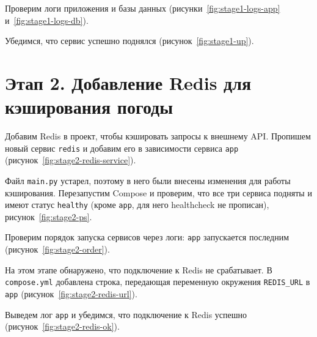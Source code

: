 
Проверим логи приложения и базы данных
(рисунки~\ref{fig:stage1-logs-app} и~\ref{fig:stage1-logs-db}).


Убедимся, что сервис успешно поднялся (рисунок~\ref{fig:stage1-up}).


\section{Этап 2. Добавление Redis для кэширования погоды}

Добавим Redis в проект, чтобы кэшировать запросы к внешнему API. Пропишем
новый сервис \texttt{redis} и добавим его в зависимости сервиса
\texttt{app} (рисунок~\ref{fig:stage2-redis-service}).


Файл \texttt{main.py} устарел, поэтому в него были внесены изменения для
работы кэширования. Перезапустим Compose и проверим, что все три сервиса
подняты и имеют статус \texttt{healthy} (кроме \texttt{app}, для него
healthcheck не прописан), рисунок~\ref{fig:stage2-ps}.


Проверим порядок запуска сервисов через логи: \texttt{app} запускается
последним (рисунок~\ref{fig:stage2-order}).


На этом этапе обнаружено, что подключение к Redis не срабатывает. В
\texttt{compose.yml} добавлена строка, передающая переменную окружения
\texttt{REDIS\_URL} в \texttt{app} (рисунок~\ref{fig:stage2-redis-url}).


Выведем лог \texttt{app} и убедимся, что подключение к Redis успешно
(рисунок~\ref{fig:stage2-redis-ok}).

